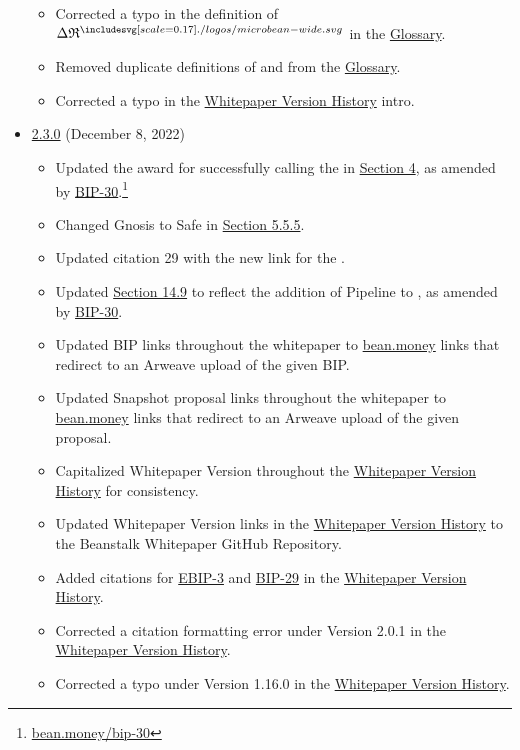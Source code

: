 \documentclass[class=article, crop=false]{standalone}
\begin{document}
\begin{itemize}[topsep=0pt, itemsep=3pt,leftmargin=16pt]
\begin{itemize}
        \item Corrected a typo in the definition of $\Delta \mathfrak{R}^{\bean}$ in the \hyperlink{subsection.14.11}{Glossary}.
        \item Removed duplicate definitions of  and  from the \hyperlink{subsection.14.11}{Glossary}.
        \item Corrected a typo in the \hyperlink{subsection.14.12}{Whitepaper Version History} intro.
    \end{itemize}  
            \item \href{https://github.com/BeanstalkFarms/Beanstalk-Whitepaper/blob/master/beanstalk.pdf}{2.3.0} (December 8, 2022)
    \begin{itemize}
        \item Updated the award for successfully calling the  in \hyperlink{section.4}{Section 4}, as amended by \href{https://bean.money/bip-30}{BIP-30}.\footnote{\href{https://bean.money/bip-30}{bean.money/bip-30}}
        \item Changed Gnosis to Safe in \hyperlink{subsubsection.5.5.5}{Section 5.5.5}.
        \item Updated citation 29 with the new link for the .
        \item Updated \hyperlink{subsection.14.9}{Section 14.9} to reflect the addition of Pipeline  to , as amended by \href{https://bean.money/bip-30}{BIP-30}.
        \item Updated BIP links throughout the whitepaper to \href{https://bean.money}{bean.money} links that redirect to an Arweave upload of the given BIP.
        \item Updated Snapshot proposal links throughout the whitepaper to \href{https://bean.money}{bean.money} links that redirect to an Arweave upload of the given proposal.
        \item Capitalized Whitepaper Version throughout the \hyperlink{subsection.14.12}{Whitepaper Version History} for consistency.
        \item Updated Whitepaper Version links in the \hyperlink{subsection.14.12}{Whitepaper Version History} to the Beanstalk Whitepaper GitHub Repository.
        \item Added citations for \href{https://bean.money/ebip-3}{EBIP-3} and \href{https://bean.money/bip-29}{BIP-29} in the \hyperlink{subsection.14.12}{Whitepaper Version History}.
        \item Corrected a citation formatting error under Version 2.0.1 in the \hyperlink{subsection.14.12}{Whitepaper Version History}.
        \item Corrected a typo under Version 1.16.0 in the \hyperlink{subsection.14.12}{Whitepaper Version History}.
    \end{itemize}  
\end{itemize}
\end{document}
